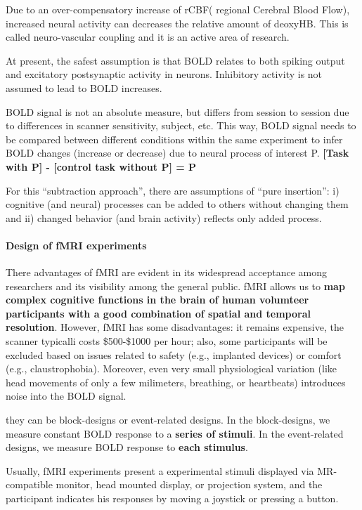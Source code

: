 \documentclass[12pt,article,oneside,a4paper]{memoir}
\begin{document}
Due to an over-compensatory increase of rCBF( regional Cerebral Blood Flow), increased neural activity can decreases the relative amount of deoxyHB. This is called neuro-vascular coupling and it is an active area of research.

At present, the safest assumption is that BOLD relates to both spiking output and excitatory postsynaptic activity in neurons. Inhibitory activity is not assumed to lead to BOLD increases.

BOLD signal is not an absolute measure, but differs from session to session due to differences in scanner sensitivity, subject, etc. This way, BOLD signal needs to be compared between different conditions within the same experiment to infer BOLD changes (increase or decrease) due to neural process of interest P. \textbf{[Task with P] - [control task without P] = P}

For this ``subtraction approach'', there are assumptions of ``pure insertion'': i) cognitive (and neural) processes can be added to others without changing them and ii) changed behavior (and brain activity) reflects only added process.

\paragraph{Design of fMRI experiments} There advantages of fMRI are evident in its widespread acceptance among researchers and its visibility among the general public. fMRI allows us to \textbf{map complex cognitive functions in the brain of human volumteer participants with a good combination of spatial and temporal resolution}. However, fMRI has some disadvantages: it remains expensive, the scanner typicalli costs \$500-\$1000 per hour; also, some participants will be excluded based on issues related to safety (e.g., implanted devices) or comfort (e.g., claustrophobia). Moreover, even very small physiological variation (like head movements of only a few milimeters, breathing, or heartbeats) introduces noise into the BOLD signal.

they can be block-designs or event-related designs. In the block-designs, we measure constant BOLD response to a \textbf{series of stimuli}. In the event-related designs, we measure BOLD response to \textbf{each stimulus}.

Usually, fMRI experiments present a experimental stimuli displayed via MR-compatible monitor, head mounted display, or projection system, and the participant indicates his responses by moving a joystick or pressing a button.
\end{document}
